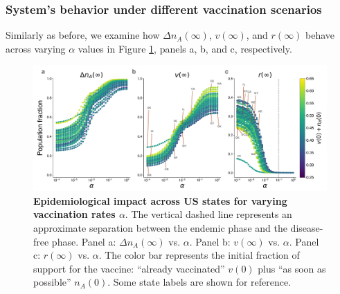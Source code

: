 \documentclass[
 reprint,
 amsmath,amssymb,
 aps,
]{revtex4-2}
\begin{document}
\subsubsection{System's behavior under different vaccination scenarios}

Similarly as before, we examine how $\Delta n_A(\infty)$, $v(\infty)$, and $r(\infty)$ behave across varying $\alpha$ values in Figure \ref{fig:main_vaccination_curves}, panels a, b, and c, respectively. 

\begin{figure}
\centering
\includegraphics[width=\textwidth]{figure3.pdf}
\caption{\label{fig:main_vaccination_curves} \textbf{Epidemiological impact across US states for varying vaccination rates $\alpha$}. The vertical dashed line represents an approximate separation between the endemic phase and the disease-free phase. Panel a: $\Delta n_A(\infty)$ vs. $\alpha$. Panel b: $v(\infty)$ vs. $\alpha$. Panel c: $r(\infty)$ vs. $\alpha$. The color bar represents the initial fraction of support for the vaccine: ``already vaccinated'' $v(0)$ plus ``as soon as possible'' $n_A(0)$. Some state labels are shown for reference.}
\end{figure}
\end{document}
